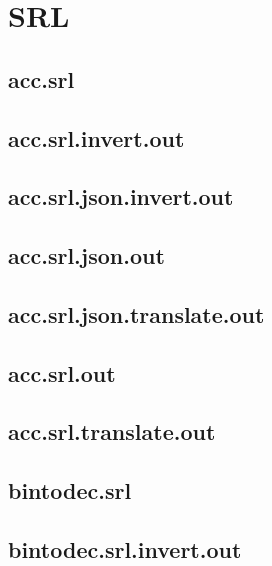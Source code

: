 \section{SRL}
\label{app:testing_srl}
\subsection{acc.srl}
\label{app:acc_srl}

\subsection{acc.srl.invert.out}
\label{app:acc_srl.invert.out}

\subsection{acc.srl.json.invert.out}
\label{app:acc_srl.json.invert.out}

\subsection{acc.srl.json.out}
\label{app:acc_srl.json.out}

\subsection{acc.srl.json.translate.out}
\label{app:acc_srl.json.translate.out}

\subsection{acc.srl.out}
\label{app:acc_srl.out}

\subsection{acc.srl.translate.out}
\label{app:acc_srl.translate.out}

\subsection{bintodec.srl}
\label{app:bintodec_srl}

\subsection{bintodec.srl.invert.out}
\label{app:bintodec_srl.invert.out}

